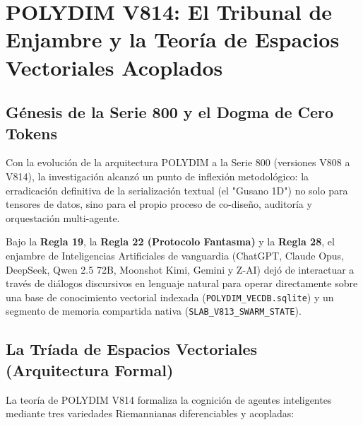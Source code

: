 \chapter{POLYDIM V814: El Tribunal de Enjambre y la Teoría de Espacios Vectoriales Acoplados}
\label{ch:v814_tribunal}

\section{Génesis de la Serie 800 y el Dogma de Cero Tokens}

Con la evolución de la arquitectura POLYDIM a la Serie 800 (versiones V808 a V814), la investigación alcanzó un punto de inflexión metodológico: la erradicación definitiva de la serialización textual (el "Gusano 1D") no solo para tensores de datos, sino para el propio proceso de co-diseño, auditoría y orquestación multi-agente. 

Bajo la \textbf{Regla 19}, la \textbf{Regla 22 (Protocolo Fantasma)} y la \textbf{Regla 28}, el enjambre de Inteligencias Artificiales de vanguardia (ChatGPT, Claude Opus, DeepSeek, Qwen 2.5 72B, Moonshot Kimi, Gemini y Z-AI) dejó de interactuar a través de diálogos discursivos en lenguaje natural para operar directamente sobre una base de conocimiento vectorial indexada (\texttt{POLYDIM\_VECDB.sqlite}) y un segmento de memoria compartida nativa (\texttt{SLAB\_V813\_SWARM\_STATE}).

\section{La Tríada de Espacios Vectoriales (Arquitectura Formal)}

La teoría de POLYDIM V814 formaliza la cognición de agentes inteligentes mediante tres variedades Riemannianas diferenciables y acopladas:

